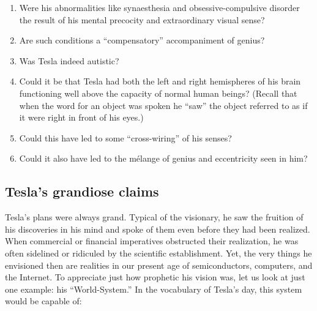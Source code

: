 \documentclass[
  11pt,
  a4paper,
]{article}
\providecommand{\tightlist}{%
  \setlength{\itemsep}{0pt}\setlength{\parskip}{0pt}}
\begin{document}
\begin{enumerate}
\tightlist
\item
  Were his abnormalities like synaesthesia and obsessive-compulsive
  disorder the result of his mental precocity and extraordinary visual
  sense?
\item
  Are such conditions a ``compensatory'' accompaniment of genius?
\item
  Was Tesla indeed autistic?
\item
  Could it be that Tesla had both the left and right hemispheres of his
  brain functioning well above the capacity of normal human beings?
  (Recall that when the word for an object was spoken he ``saw'' the
  object referred to as if it were right in front of his eyes.)
\item
  Could this have led to some ``cross-wiring'' of his senses?
\item
  Could it also have led to the mélange of genius and eccentricity seen
  in him?
\end{enumerate}

\hypertarget{teslas-grandiose-claims}{%
\subsection{Tesla's grandiose claims}\label{teslas-grandiose-claims}}

Tesla's plans were always grand. Typical of the visionary, he saw the
fruition of his discoveries in his mind and spoke of them even before
they had been realized. When commercial or financial imperatives
obstructed their realization, he was often sidelined or ridiculed by the
scientific establishment. Yet, the very things he envisioned then are
realities in our present age of semiconductors, computers, and the
Internet. To appreciate just how prophetic his vision was, let us look
at just one example: his ``World-System.'' In the vocabulary of Tesla's
day, this system would be capable of:
\end{document}
